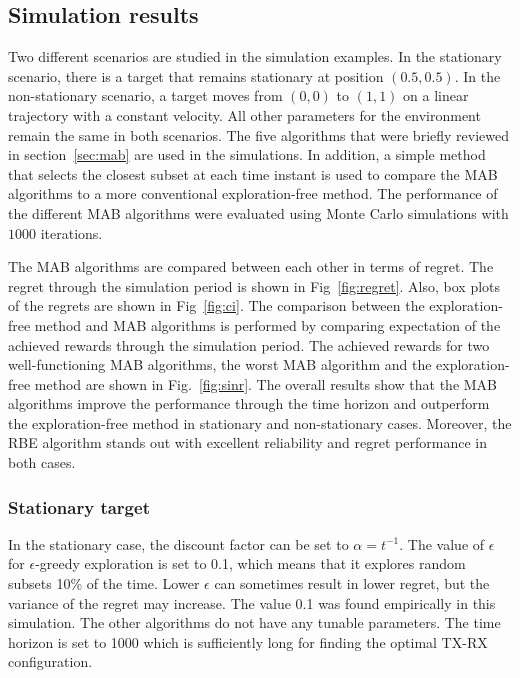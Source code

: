 \documentclass[english, 12pt, a4paper, elec, utf8, a-1b, online]{aaltothesis}
\begin{document}
\subsection{Simulation results}

Two different scenarios are studied in the simulation examples. 
In the stationary scenario, there is a target that remains stationary at position $(0.5, 0.5)$.
In the non-stationary scenario, a target moves from $(0, 0)$ to $(1, 1)$ on a linear trajectory with a constant velocity.
All other parameters for the environment remain the same in both scenarios.
The five algorithms that were briefly reviewed in section~\ref{sec:mab} are used in the simulations.
In addition, a simple method that selects the closest subset at each time instant is used to compare the MAB algorithms to a more conventional exploration-free method. 
The performance of the different MAB algorithms were evaluated using Monte Carlo simulations with $1000$ iterations.

The MAB algorithms are compared between each other in terms of regret. 
The regret through the simulation period is shown in Fig~\ref{fig:regret}. 
Also, box plots of the regrets are shown in Fig~\ref{fig:ci}.
The comparison between the exploration-free method and MAB algorithms is performed by comparing expectation of the achieved rewards through the simulation period.
The achieved rewards for two well-functioning MAB algorithms, 
the worst MAB algorithm and the exploration-free method are shown in Fig.~\ref{fig:sinr}.
The overall results show that the MAB algorithms improve the performance through the time horizon and outperform the exploration-free method in stationary and non-stationary cases.
Moreover, the RBE algorithm stands out with excellent reliability and regret performance in both cases.

\subsubsection{Stationary target}

In the stationary case, the discount factor can be set to $\alpha=t^{-1}$.
The value of $\epsilon$ for $\epsilon$-greedy exploration is set to 0.1, which means that it explores random subsets 10\% of the time.
Lower $\epsilon$ can sometimes result in lower regret, but the variance of the regret may increase.
The value 0.1 was found empirically in this simulation.
The other algorithms do not have any tunable parameters.
The time horizon is set to 1000 which is sufficiently long for finding the optimal TX-RX configuration.
\end{document}
